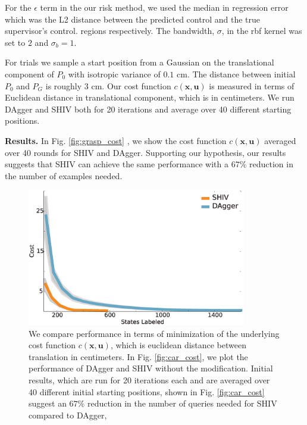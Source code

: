 \documentclass[10pt, conference]{ieeeconf}      %
\newcommand{\bu}{\mathbf{u}}
\newcommand{\bx}{\mathbf{x}}
\begin{document}
For the $\epsilon$ term in the our risk method, we used the median in regression error which was the L2 distance between the predicted control and the true supervisor's control. 
regions respectively. The bandwidth, $\sigma$, in the rbf kernel was set to $2$ and $\sigma_b = 1$.

For trials we sample a start position from a Gaussian on the translational component of $P_0$ with isotropic variance of
$0.1$ cm. The distance between initial $P_0$ and $P_G$ is roughly $3$ cm. Our cost function $c(\bx,\bu)$ is measured in
terms of Euclidean distance in translational component, which is in centimeters. We run DAgger and SHIV both for 20 iterations and average over 40 different starting positions.

\noindent\textbf{Results. }
 In Fig. \ref{fig:grasp_cost} , we show the cost function $c(\bx,\bu)$ averaged over 40 rounds for SHIV and DAgger. Supporting our hypothesis, our results suggests that SHIV can achieve the same performance with a $67\%$ reduction in the number of examples needed.






\begin{figure}[t!]
\centering
\includegraphics[width=\columnwidth, height=6cm]{figures/needle_insertion_results.eps}
\caption{We compare performance in terms of minimization of the underlying cost function $c(\bx,\bu)$, which is euclidean distance between translation in centimeters. In Fig. \ref{fig:car_cost}, we plot the performance of DAgger and SHIV without the modification.  Initial results, which are run for 20 iterations each and are averaged over 40 different initial starting positions, shown in Fig. \ref{fig:car_cost} suggest an $67\%$ reduction in the number of queries needed for SHIV compared to DAgger,}
\vspace*{-10pt}
\label{fig:needle}
\end{figure}
\end{document}
